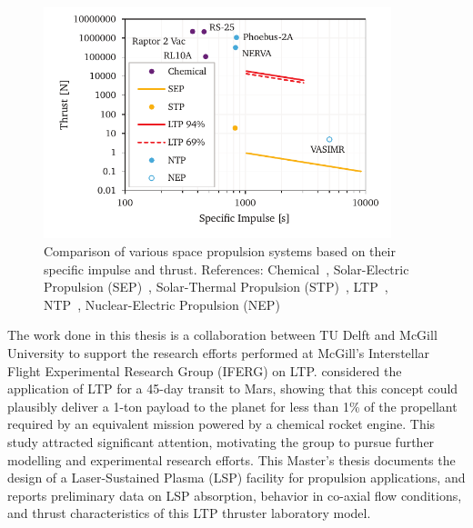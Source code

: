     \begin{figure}[h]
        \centering
        \includegraphics[width=0.9\textwidth]{assets/1 intro/propulsionComparison2}
        \caption[Comparison of various space propulsion systems]{Comparison of various space propulsion systems based on their specific impulse and thrust. References: Chemical~\cite{l3harrisRL10Engine2023,l3harrisRS25Engine2023,belluscioSpaceXAdvancesDrive2014}, Solar-Electric Propulsion (SEP)~\cite{aerojetrocketdyneNEXTCNASAEvolutionary2022}, Solar-Thermal Propulsion (STP)~\cite{woodcockEvaluationSolarThermal2003}, LTP~\cite{duplayDesignRapidTransit2022,shojiPerformanceHeatTransfer1976}, NTP~\cite{koenigExperienceGainedSpace1986}, Nuclear-Electric Propulsion (NEP)~\cite{adastraTechnology2013}}
        \label{fig:propulsion_comparison}
    \end{figure}

    The work done in this thesis is a collaboration between TU Delft and McGill University to support the research efforts performed at McGill's Interstellar Flight Experimental Research Group (IFERG) on LTP. \textcite{duplayDesignRapidTransit2022} considered the application of LTP for a 45-day transit to Mars, showing that this concept could plausibly deliver a 1-ton payload to the planet for less than 1\% of the propellant required by an equivalent mission powered by a chemical rocket engine. This study attracted significant attention, motivating the group to pursue further modelling and experimental research efforts. This Master's thesis documents the design of a Laser-Sustained Plasma (LSP) facility for propulsion applications, and reports preliminary data on LSP absorption, behavior in co-axial flow conditions, and thrust characteristics of this LTP thruster laboratory model.